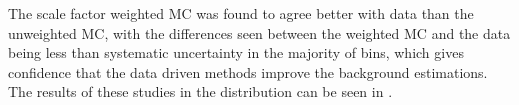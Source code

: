 The scale factor weighted \ac{MC} was found to agree better with data than the unweighted \ac{MC}, with the differences seen between the weighted \ac{MC} and the data being less than systematic uncertainty in the majority of bins, which gives confidence that the data driven methods improve the background estimations. The results of these studies in the \METnoMU distribution can be seen in .
\begin{figure}


\end{figure}

